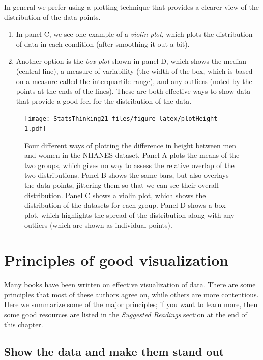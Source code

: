 \documentclass[
  12pt,
]{book}
\providecommand{\tightlist}{%
  \setlength{\itemsep}{0pt}\setlength{\parskip}{0pt}}
\begin{document}
In general we prefer using a plotting technique that provides a clearer view of the distribution of the data points.

\begin{enumerate}
\def\labelenumi{\arabic{enumi}.}
\setcounter{enumi}{2}
\tightlist
\item
  In panel C, we see one example of a \emph{violin plot}, which plots the distribution of data in each condition (after smoothing it out a bit).\\
\item
  Another option is the \emph{box plot} shown in panel D, which shows the median (central line), a measure of variability (the width of the box, which is based on a measure called the interquartile range), and any outliers (noted by the points at the ends of the lines). These are both effective ways to show data that provide a good feel for the distribution of the data.
\end{enumerate}

\begin{figure}
\centering
\texttt{[image: StatsThinking21\_files/figure-latex/plotHeight-1.pdf]}
\caption{\label{fig:plotHeight}Four different ways of plotting the difference in height between men and women in the NHANES dataset. Panel A plots the means of the two groups, which gives no way to assess the relative overlap of the two distributions. Panel B shows the same bars, but also overlays the data points, jittering them so that we can see their overall distribution. Panel C shows a violin plot, which shows the distribution of the datasets for each group. Panel D shows a box plot, which highlights the spread of the distribution along with any outliers (which are shown as individual points).}
\end{figure}

\hypertarget{principles-of-good-visualization}{%
\section{Principles of good visualization}\label{principles-of-good-visualization}}

Many books have been written on effective visualization of data. There are some principles that most of these authors agree on, while others are more contentious. Here we summarize some of the major principles; if you want to learn more, then some good resources are listed in the \emph{Suggested Readings} section at the end of this chapter.

\hypertarget{show-the-data-and-make-them-stand-out}{%
\subsection{Show the data and make them stand out}\label{show-the-data-and-make-them-stand-out}}
\end{document}

